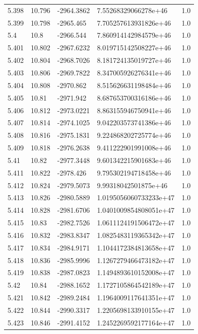 \begin{tabular}{lllll}
5.398 & 10.796 & -2964.3862 & 7.55268329066278e+46 & 1.0 \\
5.399 & 10.798 & -2965.465 & 7.705257613931826e+46 & 1.0 \\
5.4 & 10.8 & -2966.544 & 7.860914142984579e+46 & 1.0 \\
5.401 & 10.802 & -2967.6232 & 8.019715142508227e+46 & 1.0 \\
5.402 & 10.804 & -2968.7026 & 8.181724135019727e+46 & 1.0 \\
5.403 & 10.806 & -2969.7822 & 8.347005926276341e+46 & 1.0 \\
5.404 & 10.808 & -2970.862 & 8.515626631198484e+46 & 1.0 \\
5.405 & 10.81 & -2971.942 & 8.687653700316186e+46 & 1.0 \\
5.406 & 10.812 & -2973.0221 & 8.863155946750941e+46 & 1.0 \\
5.407 & 10.814 & -2974.1025 & 9.042203573741386e+46 & 1.0 \\
5.408 & 10.816 & -2975.1831 & 9.224868202725774e+46 & 1.0 \\
5.409 & 10.818 & -2976.2638 & 9.411222901991008e+46 & 1.0 \\
5.41 & 10.82 & -2977.3448 & 9.601342215901683e+46 & 1.0 \\
5.411 & 10.822 & -2978.426 & 9.795302194718458e+46 & 1.0 \\
5.412 & 10.824 & -2979.5073 & 9.99318042501875e+46 & 1.0 \\
5.413 & 10.826 & -2980.5889 & 1.0195056060733233e+47 & 1.0 \\
5.414 & 10.828 & -2981.6706 & 1.0401009854808051e+47 & 1.0 \\
5.415 & 10.83 & -2982.7526 & 1.0611124191506472e+47 & 1.0 \\
5.416 & 10.832 & -2983.8347 & 1.0825483119365342e+47 & 1.0 \\
5.417 & 10.834 & -2984.9171 & 1.1044172384813658e+47 & 1.0 \\
5.418 & 10.836 & -2985.9996 & 1.1267279466473182e+47 & 1.0 \\
5.419 & 10.838 & -2987.0823 & 1.1494893610152008e+47 & 1.0 \\
5.42 & 10.84 & -2988.1652 & 1.1727105864542189e+47 & 1.0 \\
5.421 & 10.842 & -2989.2484 & 1.1964009117641351e+47 & 1.0 \\
5.422 & 10.844 & -2990.3317 & 1.2205698133910155e+47 & 1.0 \\
5.423 & 10.846 & -2991.4152 & 1.2452269592177164e+47 & 1.0 \\

\end{tabular}
